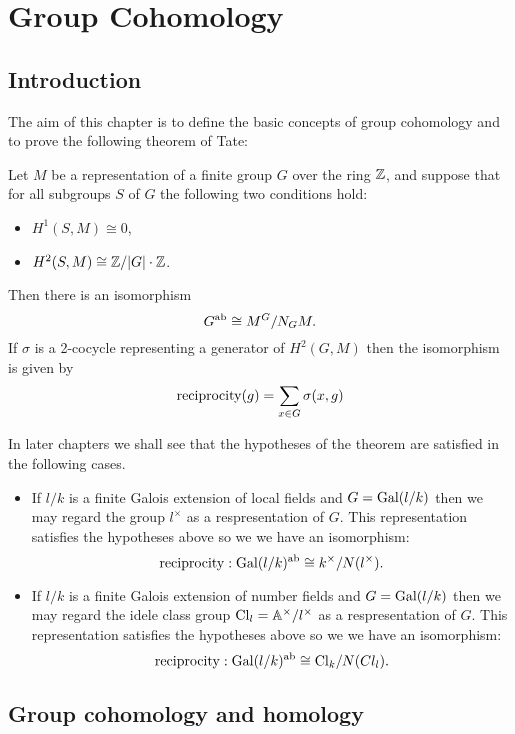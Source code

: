 \chapter{Group Cohomology}

\section{Introduction}

The aim of this chapter is to define the basic concepts of group cohomology and to
prove the following theorem of Tate:

\begin{theorem}
	Let $M$ be a representation of a finite group $G$ over the ring ${\mathbb Z}$, and suppose
	that for all subgroups $S$ of $G$ the following two conditions hold:
	\begin{itemize}
		\item
		$H^1(S,M) \cong 0$,
		\item
		$H^2(S,M) \cong {\mathbb Z} / |G| \cdot {\mathbb Z}$.
	\end{itemize}
	Then there is an isomorphism
	\[
		G^{\mathrm{ab}} \cong M^G / N_G M.
	\]
	If $\sigma$ is a 2-cocycle representing a generator of $H^2(G,M)$ then the isomorphism
	is given by
	\[
		\mathrm{reciprocity}(g) = \sum_{x \in G} \sigma(x,g)
	\]
\end{theorem}

In later chapters we shall see that the hypotheses of the theorem are satisfied in the following
cases.
\begin{itemize}
	\item
	If $l/k$ is a finite Galois extension of local fields and $G = \mathrm{Gal}(l/k)$ then we
	may regard the group $l^\times$ as a respresentation of $G$. This representation
	satisfies the hypotheses above so we we have an isomorphism:
	\[
		\mathrm{reciprocity} : \mathrm{Gal}(l/k)^{\mathrm{ab}} \cong k^\times / N(l^\times).
	\]
	\item
	If $l/k$ is a finite Galois extension of number fields and $G = \mathrm{Gal}(l/k)$ then we
	may regard the idele class group $\mathrm{Cl}_l = {\mathbb A}^\times / l^\times$ as a respresentation of $G$.
	This representation satisfies the hypotheses above so we we have an isomorphism:
	\[
		\mathrm{reciprocity} : \mathrm{Gal}(l/k)^{\mathrm{ab}} \cong \mathrm{Cl}_k / N(Cl_l).
	\]
\end{itemize}






\section{Group cohomology and homology}

